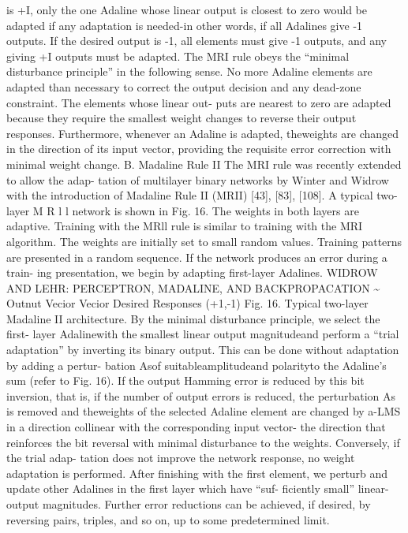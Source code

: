 is +I, only the one Adaline whose linear output is closest to zero would
be adapted if any adaptation is needed-in other words, if all Adalines
give -1 outputs. If the desired output is -1, all elements must give -1
outputs, and any giving +I outputs must be adapted. The MRI rule obeys
the ``minimal disturbance principle'' in the following sense. No more
Adaline elements are adapted than necessary to correct the output
decision and any dead-zone constraint. The elements whose linear out-
puts are nearest to zero are adapted because they require the smallest
weight changes to reverse their output responses. Furthermore, whenever
an Adaline is adapted, theweights are changed in the direction of its
input vector, providing the requisite error correction with minimal
weight change. B. Madaline Rule II The MRI rule was recently extended to
allow the adap- tation of multilayer binary networks by Winter and
Widrow with the introduction of Madaline Rule II (MRII) {[}43{]},
{[}83{]}, {[}108{]}. A typical two-layer M R l l network is shown in
Fig. 16. The weights in both layers are adaptive. Training with the MRll
rule is similar to training with the MRI algorithm. The weights are
initially set to small random values. Training patterns are presented in
a random sequence. If the network produces an error during a train- ing
presentation, we begin by adapting first-layer Adalines. WIDROW AND
LEHR: PERCEPTRON, MADALINE, AND BACKPROPACATION \textasciitilde{} Outnut
Vecior Vecior Desired Responses (+1,-1) Fig. 16. Typical two-layer
Madaline II architecture. By the minimal disturbance principle, we
select the first- layer Adalinewith the smallest linear output
magnitudeand perform a ``trial adaptation'' by inverting its binary
output. This can be done without adaptation by adding a pertur- bation
Asof suitableamplitudeand polarityto the Adaline's sum (refer to Fig.
16). If the output Hamming error is reduced by this bit inversion, that
is, if the number of output errors is reduced, the perturbation As is
removed and theweights of the selected Adaline element are changed by
a-LMS in a direction collinear with the corresponding input vector- the
direction that reinforces the bit reversal with minimal disturbance to
the weights. Conversely, if the trial adap- tation does not improve the
network response, no weight adaptation is performed. After finishing
with the first element, we perturb and update other Adalines in the
first layer which have ``suf- ficiently small'' linear-output
magnitudes. Further error reductions can be achieved, if desired, by
reversing pairs, triples, and so on, up to some predetermined limit.
